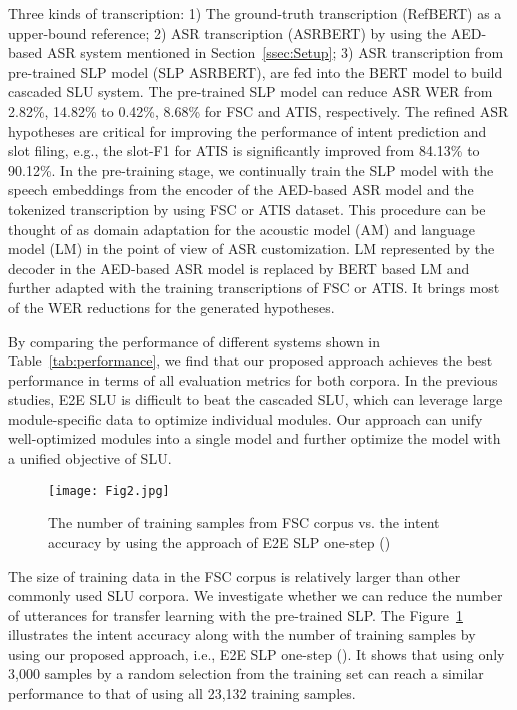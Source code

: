 \documentclass{article}
\begin{document}
Three kinds of transcription: 1) The ground-truth transcription (RefBERT) as a upper-bound reference; 2) ASR transcription (ASRBERT) by using the AED-based ASR system mentioned in Section~\ref{ssec:Setup}; 3) ASR transcription from pre-trained SLP model (SLP ASRBERT), are fed into the BERT model to build cascaded SLU system. The pre-trained SLP model can reduce ASR WER from 2.82\%, 14.82\% to 0.42\%, 8.68\% for FSC and ATIS, respectively.  The refined ASR hypotheses are critical for improving the performance of intent prediction and slot filing, e.g., the slot-F1 for ATIS is significantly improved from 84.13\% to 90.12\%. In the pre-training stage, we continually train the SLP model with the speech embeddings from the encoder of the AED-based ASR model and the tokenized transcription by using FSC or ATIS dataset. This procedure can be thought of as domain adaptation for the acoustic model (AM) and language model (LM) in the point of view of ASR customization. LM represented by the decoder in the AED-based ASR model is replaced by BERT based LM and further adapted with the training transcriptions of FSC or ATIS. It brings most of the WER reductions for the generated hypotheses. 

By comparing the performance of different systems shown in Table~\ref{tab:performance}, we find that our proposed approach achieves the best performance in terms of all evaluation metrics for both corpora.  In the previous studies, E2E SLU is difficult to beat the cascaded SLU, which can leverage large module-specific data to optimize individual modules. Our approach can unify well-optimized modules into a single model and further optimize the model with a unified objective of SLU.

\begin{figure}[htb]
\begin{minipage}[b]{1.0\linewidth}
  \centering
  \centerline{\texttt{[image: Fig2.jpg]}}
\end{minipage}
\caption{The number of training samples from FSC corpus vs. the intent accuracy by using the approach of E2E SLP one-step () }
\label{fig:numofsamples}
\end{figure}

The size of training data in the FSC corpus is relatively larger than other commonly used SLU corpora. We investigate whether we can reduce the number of utterances for transfer learning with the pre-trained SLP. The Figure~\ref{fig:numofsamples} illustrates the intent accuracy along with the number of training samples by using our proposed approach, i.e., E2E SLP one-step ().  It shows that using only 3,000 samples by a random selection from the training set can reach a similar performance to that of using all 23,132 training samples. 
\end{document}
